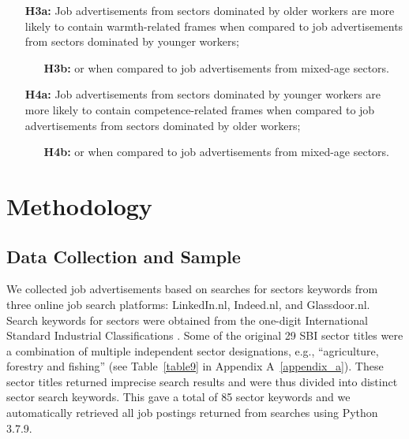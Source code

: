 \documentclass[jou]{apa7}
\begin{document}
\begin{enumerate}
\item[\textbf{H3a:}] Job advertisements from sectors dominated by older workers are more likely to contain warmth-related frames when compared to job advertisements from sectors dominated by younger workers;

\begin{enumerate}
\item[\textbf{H3b:}] or when compared to job advertisements from mixed-age sectors.
\end{enumerate}

\item[\textbf{H4a:}] Job advertisements from sectors dominated by younger workers are more likely to contain competence-related frames when compared to job advertisements from sectors dominated by older workers;

\begin{enumerate}
\item[\textbf{H4b:}] or when compared to job advertisements from mixed-age sectors.

\end{enumerate}
\end{enumerate}

\section{Methodology}
\label{methodology}
\subsection{Data Collection and Sample}
\label{data_collection_and_sample}
We collected job advertisements based on searches for sectors keywords from three online job search platforms: LinkedIn.nl, Indeed.nl, and Glassdoor.nl. Search keywords for sectors were obtained from the one-digit International Standard Industrial Classifications \textcite[SBI2008;][]{centraalbureauvoordestatistiekStandardIndustrialClassifications2018}. Some of the original 29 SBI sector titles were a combination of multiple independent sector designations, e.g., “agriculture, forestry and fishing” (see Table~\ref{table9} in Appendix A~\ref{appendix_a}). These sector titles returned imprecise search results and were thus divided into distinct sector search keywords. This gave a total of 85 sector keywords and we automatically retrieved all job postings returned from searches using Python 3.7.9.
\end{document}
